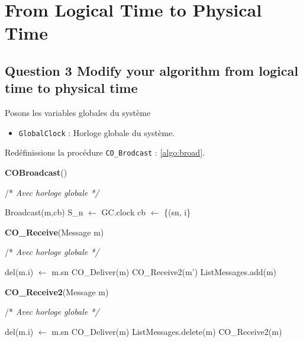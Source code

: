 \chapter{From Logical Time to Physical Time}

\section{Question 3 Modify your algorithm from logical time to physical time}

Posons les variables globales du système

\begin{itemize}
\item  \verb+GlobalClock+ : Horloge globale du système.
\end{itemize}


Redéfinissions la procédure \verb+CO_Brodcast+ : \ref{algo:broad}.

\begin{algorithm}
\caption{\textbf{COBroadcast}()}
/* \textit{ Avec horloge globale */}
\label{algo:broad}
\begin{algorithmic}[1]
\STATE Broadcast(m,cb)
\STATE S\_n $\leftarrow$ GC.clock
\STATE cb $\leftarrow $ \{(sn, i\}
\end{algorithmic}
\end{algorithm}



\begin{algorithm}
\caption{\textbf{CO\_Receive}(Message m)}
/* \textit{ Avec horloge globale */}
\label{algo:q3}
\begin{algorithmic}[1]
   \STATE  del(m.i) $\leftarrow$ m.sn
   \STATE  CO\_Deliver(m)
   \STATE   CO\_Receive2(m')
   \ENDFOR
   \ELSE
   \STATE ListMessages.add(m)
  \ENDIF  
\end{algorithmic}
\end{algorithm}


\begin{algorithm}
\caption{\textbf{CO\_Receive2}(Message m)}
/* \textit{ Avec horloge globale */}
\label{algo:receive2}
\begin{algorithmic}[1]
   \STATE  del(m.i) $\leftarrow$ m.sn
   \STATE  CO\_Deliver(m)
   \STATE ListMessages.delete(m)
   \STATE CO\_Receive2(m)
   \ENDFOR
  \ENDIF  
\end{algorithmic}
\end{algorithm}

